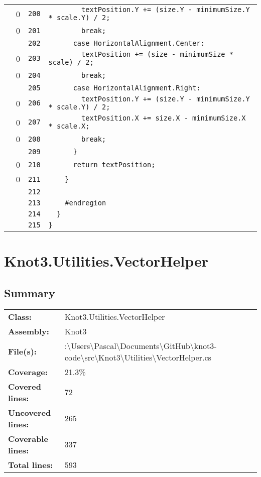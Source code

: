 \documentclass[a4paper,10pt]{article}
\begin{document}
\begin{longtable}[l]{lrrl}
\cellcolor{red} & 0 & \verb~200~ & \verb~        textPosition.Y += (size.Y - minimumSize.Y * scale.Y) / 2;~\\
\cellcolor{red} & 0 & \verb~201~ & \verb~        break;~\\
\cellcolor{gray} &  & \verb~202~ & \verb~      case HorizontalAlignment.Center:~\\
\cellcolor{red} & 0 & \verb~203~ & \verb~        textPosition += (size - minimumSize * scale) / 2;~\\
\cellcolor{red} & 0 & \verb~204~ & \verb~        break;~\\
\cellcolor{gray} &  & \verb~205~ & \verb~      case HorizontalAlignment.Right:~\\
\cellcolor{red} & 0 & \verb~206~ & \verb~        textPosition.Y += (size.Y - minimumSize.Y * scale.Y) / 2;~\\
\cellcolor{red} & 0 & \verb~207~ & \verb~        textPosition.X += size.X - minimumSize.X * scale.X;~\\
\cellcolor{red} & 0 & \verb~208~ & \verb~        break;~\\
\cellcolor{gray} &  & \verb~209~ & \verb~      }~\\
\cellcolor{red} & 0 & \verb~210~ & \verb~      return textPosition;~\\
\cellcolor{red} & 0 & \verb~211~ & \verb~    }~\\
\cellcolor{gray} &  & \verb~212~ & \verb~~\\
\cellcolor{gray} &  & \verb~213~ & \verb~    #endregion~\\
\cellcolor{gray} &  & \verb~214~ & \verb~  }~\\
\cellcolor{gray} &  & \verb~215~ & \verb~}~\\
\end{longtable}
\newpage
\section{Knot3.Utilities.VectorHelper}
\subsection{Summary}
\begin{longtable}[l]{ll}
\textbf{Class:} & Knot3.Utilities.VectorHelper\\
\textbf{Assembly:} & Knot3\\
\textbf{File(s):} & \begin{minipage}[t]{12cm}{:\textbackslash Users\textbackslash Pascal\textbackslash Documents\textbackslash GitHub\textbackslash knot3-code\textbackslash src\textbackslash Knot3\textbackslash Utilities\textbackslash VectorHelper.cs}\end{minipage} \\
\textbf{Coverage:} & 21.3\%\\
\textbf{Covered lines:} & 72\\
\textbf{Uncovered lines:} & 265\\
\textbf{Coverable lines:} & 337\\
\textbf{Total lines:} & 593\\
\end{longtable}
\end{document}

